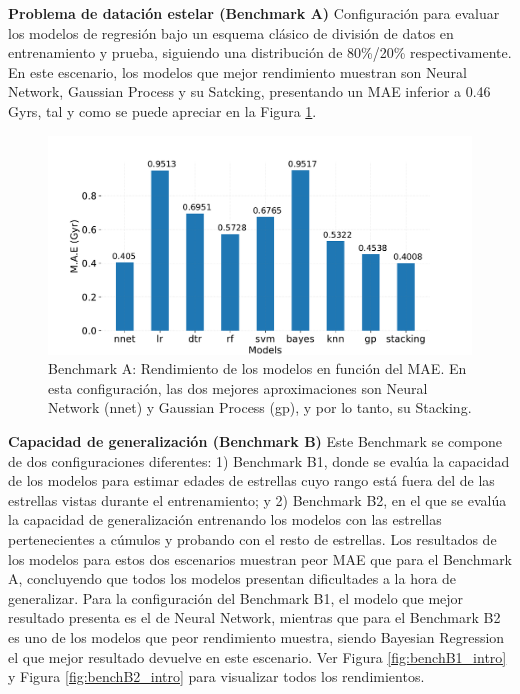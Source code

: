 \vspace{0.25cm}
\textbf{Problema de datación estelar (Benchmark A)} {} Configuración para evaluar los modelos de regresión bajo un esquema clásico de división de datos en entrenamiento y prueba, siguiendo una distribución de 80\%/20\% respectivamente. En este escenario, los modelos que mejor rendimiento muestran son Neural Network, Gaussian Process y su Satcking, presentando un MAE inferior a 0.46 Gyrs, tal y como se puede apreciar en la Figura \ref{fig:benchA_models_intro}.

\begin{figure}[H]
\begin{center}
 \includegraphics[width=0.8\linewidth]{Figuras/Experimentos/B_A_models.pdf}
\end{center}
\caption{Benchmark A: Rendimiento de los modelos en función del MAE. En esta configuración, las dos mejores aproximaciones son Neural Network (nnet) y Gaussian Process (gp), y por lo tanto, su Stacking.}
 \label{fig:benchA_models_intro}
\end{figure}

\vspace{0.25cm}

\textbf{Capacidad de generalización (Benchmark B)} {} Este Benchmark se compone de dos configuraciones diferentes: 1) Benchmark B1, donde se evalúa la capacidad de los modelos para estimar edades de estrellas cuyo rango está fuera del de las estrellas vistas durante el entrenamiento; y 2) Benchmark B2, en el que se evalúa la capacidad de generalización entrenando los modelos con las estrellas pertenecientes a cúmulos y probando con el resto de estrellas. Los resultados de los modelos para estos dos escenarios muestran peor MAE que para el Benchmark A, concluyendo que todos los modelos presentan dificultades a la hora de generalizar. Para la configuración del Benchmark B1, el modelo que mejor resultado presenta es el de Neural Network, mientras que para el Benchmark B2 es uno de los modelos que peor rendimiento muestra, siendo Bayesian Regression el que mejor resultado devuelve en este escenario. Ver Figura \ref{fig:benchB1_intro} y Figura \ref{fig:benchB2_intro} para visualizar todos los rendimientos.


